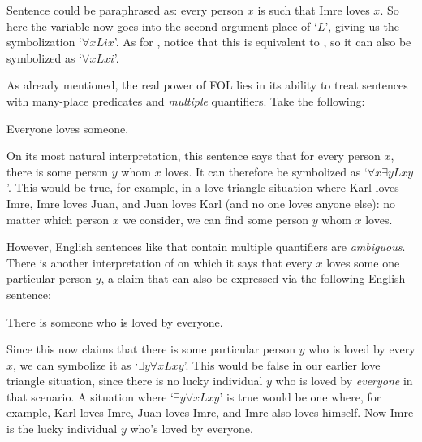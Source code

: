 Sentence  could be paraphrased as: every person $x$ is such that Imre loves $x$.  So here the variable now goes into the second argument place of `$L$', giving us the symbolization `$\forall xLix$'.  As for , notice that this is equivalent to , so it can also be symbolized as `$\forall xLxi$'.

As already mentioned, the real power of FOL lies in its ability to treat sentences with many-place predicates and \emph{multiple} quantifiers.  Take the following:
	\begin{earg}
		\item[\ex{elovs}] Everyone loves someone.
	\end{earg}
On its most natural interpretation, this sentence says that for every person $x$, there is some person $y$ whom $x$ loves. It can therefore be symbolized as `$\forall x \exists yLxy$'.  This would be true, for example, in a love triangle situation where Karl loves Imre, Imre loves Juan, and Juan loves Karl (and no one loves anyone else): no matter which person  $x$ we consider, we can find some person $y$ whom $x$ loves.

However, English sentences like  that contain multiple quantifiers are \emph{ambiguous}.  There is another interpretation of  on which it says that every $x$ loves some one particular person $y$, a claim that can also be expressed via the following English sentence:
	\begin{earg}
		\item[\ex{slovbye}] There is someone who is loved by everyone.
	\end{earg}
Since this now claims that there is some particular person $y$ who is loved by every $x$, we can symbolize it as `$\exists y\forall xLxy$'.  This would be false in our earlier love triangle situation, since there is no lucky individual $y$ who is loved by \emph{everyone} in that scenario.  A situation where `$\exists y\forall xLxy$' is true would be one where, for example, Karl loves Imre, Juan loves Imre, and Imre also loves himself.  Now Imre is the lucky individual $y$ who's loved by everyone.


